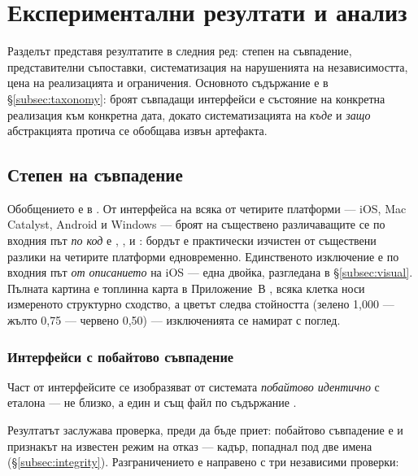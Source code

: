 \section{Експериментални резултати и анализ}
\label{sec:results}

Разделът представя резултатите в следния ред: степен на съвпадение, представителни съпоставки,
систематизация на нарушенията на независимостта, цена на реализацията и ограничения. Основното
съдържание е в §\ref{subsec:taxonomy}: броят съвпадащи интерфейси е състояние на конкретна
реализация към конкретна дата, докато систематизацията на \emph{къде} и \emph{защо} абстракцията
протича се обобщава извън артефакта.

\subsection{Степен на съвпадение}
\label{subsec:agreement}

Обобщението е в . От \boardPages{} интерфейса на всяка от четирите платформи ---
iOS, Mac Catalyst, Android и Windows --- броят на съществено различаващите се по входния път
\emph{по код} е \boardRedios{}, \boardRedmaccatalyst{}, \boardRedandroid{} и \boardRedwindows{}:
бордът е практически изчистен от съществени разлики на четирите платформи едновременно. Единственото
изключение е по входния път \emph{от описанието} на iOS --- една двойка, разгледана в
§\ref{subsec:visual}. Пълната картина е топлинна карта в Приложение~В , всяка
клетка носи измереното структурно сходство, а цветът следва стойността (зелено 1{,}000 --- жълто
0{,}75 --- червено 0{,}50) --- изключенията се намират с поглед.



\subsubsection{Интерфейси с побайтово съвпадение}
\label{subsec:integrity_finding}

Част от интерфейсите се изобразяват от системата \emph{побайтово идентично} с еталона --- не
близко, а един и същ файл по съдържание .



Резултатът заслужава проверка, преди да бъде приет: побайтово съвпадение е и признакът на
известен режим на отказ --- кадър, попаднал под две имена (§\ref{subsec:integrity}).
Разграничението е направено с три независими проверки:

